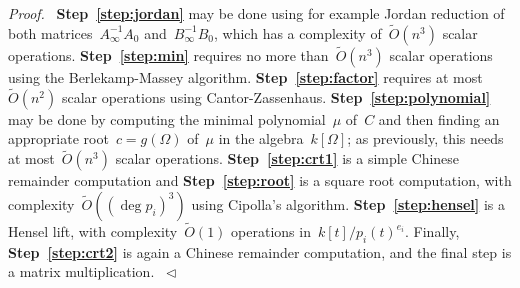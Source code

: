 \documentclass{article}
\newenvironment{proof}{\textit{Proof.}~}{~$\lhd$}
\def\Otilde#1{\ensuremath{\widetilde O\left(#1\right)}}
\begin{document}
\begin{proof}
\textbf{Step~\ref{step:jordan}}
may be done using for example Jordan reduction of both
matrices~$A_{\infty}^{-1} A_0$ and~$B_{\infty}^{-1} B_0$, which has a complexity
of~\Otilde{n^3} scalar operations.
\textbf{Step~\ref{step:min}} requires no more than~\Otilde{n^3} scalar
operations using the Berlekamp-Massey algorithm.
\textbf{Step~\ref{step:factor}} requires at most~\Otilde{n^2} scalar
operations using Cantor-Zassenhaus.
\textbf{Step~\ref{step:polynomial}} may be done by computing the minimal
polynomial~$\mu$ of~$C$ and then finding an appropriate root~$c = g(\Omega)$
of~$\mu$ in the algebra~$k[\Omega]$; as previously, this needs at
most~\Otilde{n^3} scalar operations.
\textbf{Step~\ref{step:crt1}} is a simple Chinese remainder computation
and \textbf{Step~\ref{step:root}} is a square root computation, with
complexity~\Otilde{(\deg p_i)^3} using Cipolla's algorithm.
\textbf{Step~\ref{step:hensel}} is a Hensel lift, with
complexity~\Otilde{1} operations in~$k[t]/p_i(t)^{e_i}$.
Finally, \textbf{Step~\ref{step:crt2}} is again a Chinese remainder
computation, and the final step is a matrix multiplication.
\end{proof}

% 
% 
% 
\end{document}
